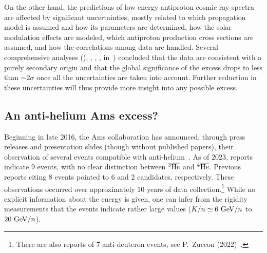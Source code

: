 On the other hand, the predictions of low energy antiproton cosmic ray spectra are affected by significant uncertainties, mostly related to which propagation model is assumed and how its parameters are determined, how the solar modulation effects are modeled, which antiproton production cross sections are assumed, and how the correlations among data are handled. Several comprehensive analyses (), , , ,  in~\cite{pbarexcess}) concluded that the data are consistent with a purely secondary origin and that the global significance of the excess drops to less than $\sim2\sigma$ once all the uncertainties are taken into account. 
Further reduction in these uncertainties will thus provide more insight into any possible excess.

\subsection{An anti-helium {\sc Ams} excess?}\label{sec:antiHeexcess}
Beginning in late 2016, the {\sc Ams} collaboration has announced, through press releases and presentation slides (though without published papers), their observation of several events compatible with anti-helium~\cite{Antihelium}. 
As of 2023, reports indicate 9 events, with no clear distinction between $^3\overline{\rm He}$ and ${}^4\overline{\rm He}$. 
Previous reports citing 8 events pointed to 6 and 2 candidates, respectively. These observations occurred over approximately 10 years of data collection.\footnote{There are also reports of 7 anti-deuteron events, see P.~Zuccon (2022)~\cite{Antihelium}.} While no explicit information about the energy is given,  one can infer from the rigidity measurements that the events indicate rather large values ($K/n \simeq 6 \ {\rm GeV}/n$ to $20 \ {\rm GeV}/n$).



\smallskip

